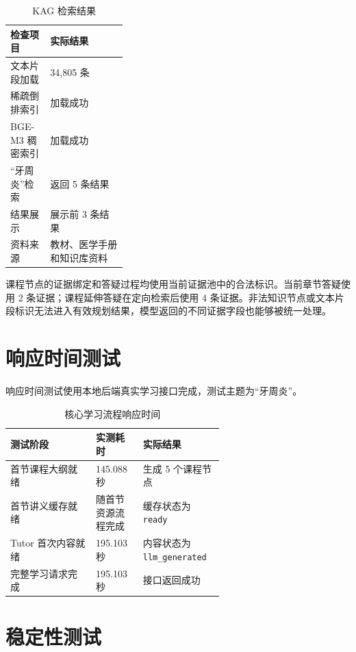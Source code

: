 \begin{table}[H]
  \centering
  \caption{KAG 检索结果}
  \label{tab:kag-retrieval-test}
  \begin{tabularx}{\linewidth}{p{0.34\linewidth}X}
    \toprule
    检查项目 & 实际结果 \\
    \midrule
    文本片段加载 & 34,805 条 \\
    稀疏倒排索引 & 加载成功 \\
    BGE-M3 稠密索引 & 加载成功 \\
    “牙周炎”检索 & 返回 5 条结果 \\
    结果展示 & 展示前 3 条结果 \\
    资料来源 & 教材、医学手册和知识库资料 \\
    \bottomrule
  \end{tabularx}
\end{table}

课程节点的证据绑定和答疑过程均使用当前证据池中的合法标识。当前章节答疑使用 2 条证据；课程延伸答疑在定向检索后使用 4 条证据。非法知识节点或文本片段标识无法进入有效规划结果，模型返回的不同证据字段也能够被统一处理。

\section{响应时间测试}

响应时间测试使用本地后端真实学习接口完成，测试主题为“牙周炎”。

\begin{table}[H]
  \centering
  \caption{核心学习流程响应时间}
  \label{tab:latency-test}
  \begin{tabularx}{\linewidth}{p{0.40\linewidth}p{0.22\linewidth}X}
    \toprule
    测试阶段 & 实测耗时 & 实际结果 \\
    \midrule
    首节课程大纲就绪 & 145.088 秒 & 生成 5 个课程节点 \\
    首节讲义缓存就绪 & 随首节资源流程完成 & 缓存状态为 \texttt{ready} \\
    Tutor 首次内容就绪 & 195.103 秒 & 内容状态为 \texttt{llm\_generated} \\
    完整学习请求完成 & 195.103 秒 & 接口返回成功 \\
    \bottomrule
  \end{tabularx}
\end{table}

\section{稳定性测试}

